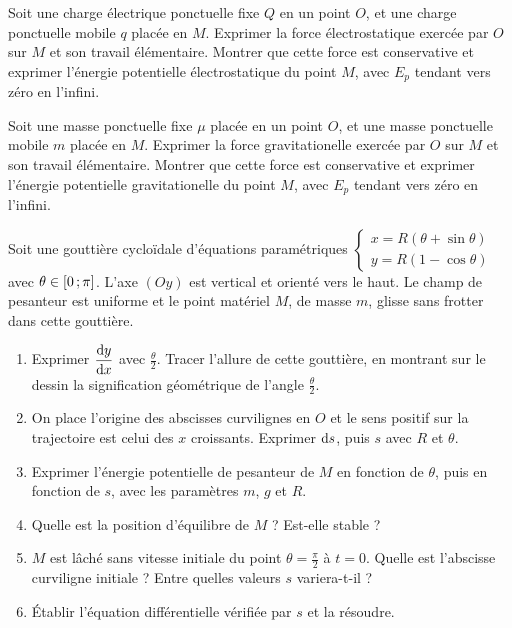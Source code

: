 \begin{exercice}
  Soit une charge électrique ponctuelle fixe $Q$ en un point $O$, et une charge ponctuelle mobile $q$ placée en $M$. Exprimer la force électrostatique exercée par $O$ sur $M$ et son travail élémentaire. Montrer que cette force est conservative et exprimer l'énergie potentielle électrostatique du point $M$, avec $E_p$ tendant vers zéro en l'infini.
\end{exercice}
%
\begin{exercice}
  Soit une masse ponctuelle fixe $\mu$ placée en un point $O$, et une masse ponctuelle mobile $m$ placée en $M$. Exprimer la force gravitationelle exercée par $O$ sur $M$ et son travail élémentaire. Montrer que cette force est conservative et exprimer l'énergie potentielle gravitationelle du point $M$, avec $E_p$ tendant vers zéro en l'infini.
\end{exercice}
%
\begin{exercice}
  Soit une gouttière cycloïdale d'équations paramétriques $\begin{cases} x = R(\theta +\sin\theta) \\ y=R(1-\cos\theta)\end{cases}$ avec $\theta \in \left[ 0 \, ;  \pi \right]$. L'axe $(Oy)$ est vertical et orienté vers le haut. Le champ de pesanteur est uniforme et le point matériel $M$, de masse $m$, glisse sans frotter dans cette gouttière.

  \begin{enumerate}
  \item Exprimer $\dfrac{\mathrm{d} y}{\mathrm{d} x}$ avec $\frac{\theta}{2}$. Tracer l'allure de cette gouttière, en montrant sur le dessin la signification géométrique de l'angle $\frac{\theta}{2}$.
  \item On place l'origine des abscisses curvilignes en $O$ et le sens positif sur la trajectoire est celui des $x$ croissants. Exprimer $\mathrm{d} s$, puis $s$ avec $R$ et $\theta$.
  \item Exprimer l'énergie potentielle de pesanteur de $M$ en fonction de $\theta$, puis en fonction de $s$, avec les paramètres $m$, $g$ et $R$.
  \item Quelle est la position d'équilibre de $M$ ? Est-elle stable ?
  \item $M$ est lâché sans vitesse initiale du point $\theta=\frac{\pi}{2}$ à $t=0$. Quelle est l'abscisse curviligne initiale ? Entre quelles valeurs $s$ variera-t-il ?
  \item Établir l'équation différentielle vérifiée par $s$ et la résoudre.
 \end{enumerate}
\end{exercice}
